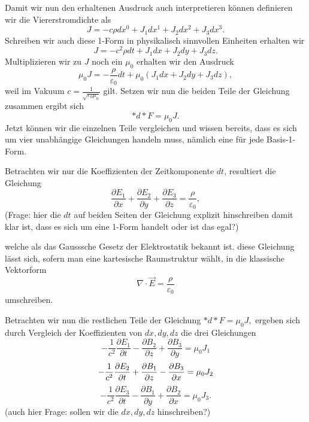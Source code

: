 Damit wir nun den erhaltenen Ausdruck auch interpretieren können definieren wir die Viererstromdichte als
\begin{equation}
	J = -c\rho dx^0 + J_1 dx^1 + J_2 dx^2 +J_3 dx^3.
\end{equation}
Schreiben wir auch diese 1-Form in physikalisch sinnvollen Einheiten erhalten wir 
\begin{equation}
	J = -c^2\rho dt + J_1 dx + J_2 dy + J_3 dz.
\end{equation}
Multiplizieren wir zu $J$ noch ein $\mu_0$ erhalten wir den Ausdruck
\begin{equation}
	\mu_0 J = -\frac{\rho}{\varepsilon_0}dt + \mu_0 (J_1 dx +  J_2 dy +  J_3 dz),
\end{equation}
weil im Vakuum $c = \frac{1}{\sqrt{\varepsilon_0 \mu_0}}$ gilt. Setzen wir nun die beiden Teile der Gleichung zusammen ergibt sich
\begin{equation}
	\ast d \ast F = \mu_0 J.
\end{equation}
Jetzt können wir die einzelnen Teile vergleichen und wissen bereits, dass es sich um vier unabhängige Gleichungen handeln muss, nämlich eine für jede Basis-1-Form.

Betrachten wir nur die Koeffizienten der Zeitkomponente $dt$, resultiert die Gleichung
\begin{equation}
	\frac{\partial E_1}{\partial x} +\frac{\partial E_2}{\partial y} + \frac{\partial E_3}{\partial z} = \frac{\rho}{\varepsilon_0},
\end{equation}
(Frage: hier die $dt$ auf beiden Seiten der Gleichung explizit hinschreiben damit klar ist, dass es sich um eine 1-Form handelt oder ist das egal?)

welche als das Gausssche Gesetz der Elektrostatik bekannt ist.
diese Gleichung lässt sich, sofern man eine kartesische Raumstruktur wählt, in die klassische Vektorform
\begin{equation}
	\nabla \cdot \vec{E} = \frac{\rho}{\varepsilon_0}
\end{equation}
umschreiben.

Betrachten wir nun die restlichen Teile der Gleichung $\ast d \ast F = \mu_0 J,$ ergeben sich durch Vergleich der Koeffizienten von $dx,dy,dz$ die drei Gleichungen
\begin{equation}
	-\frac{1}{c^2}\frac{\partial E_1}{\partial t} - \frac{\partial B_2}{\partial z} + \frac{\partial B_3}{\partial y} = \mu_0 J_1
\end{equation}
\begin{equation}
	-\frac{1}{c^2}\frac{\partial E_2}{\partial t} + \frac{\partial B_1}{\partial z} - \frac{\partial B_3}{\partial x} = \mu_0 J_2\\
\end{equation}
\begin{equation}
	 -\frac{1}{c^2}\frac{\partial E_3}{\partial t} - \frac{\partial B_1}{\partial y} + \frac{\partial B_2}{\partial x} = \mu_0 J_3.
\end{equation}
(auch hier Frage: sollen wir die $dx,dy,dz$ hinschreiben?)

